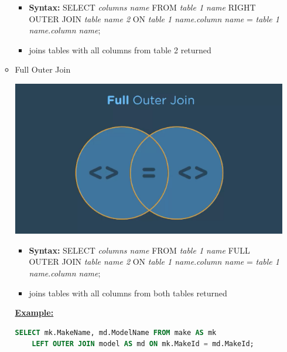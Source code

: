 \documentclass[12pt]{article}
\begin{document}
\begin{itemize}
\begin{itemize}
        \begin{itemize}
            \item \textbf{Syntax:} SELECT \textit{columns name} FROM \textit{table 1 name}
            RIGHT OUTER JOIN \textit{table name 2} ON \textit{table 1 name}.\textit{column name} = \textit{table 1 name}.\textit{column name};
            \item joins tables with all columns from table 2 returned
        \end{itemize}

        \item Full Outer Join
        \begin{center}
        \includegraphics[width=0.6\linewidth]{images/part_4_notes_7.png}
        \end{center}

        \begin{itemize}
            \item \textbf{Syntax:} SELECT \textit{columns name} FROM \textit{table 1 name}
            FULL OUTER JOIN \textit{table name 2} ON \textit{table 1 name}.\textit{column name} = \textit{table 1 name}.\textit{column name};
            \item joins tables with all columns from both tables returned
        \end{itemize}

        \bigskip

        \underline{\textbf{Example:}}

        \bigskip

    \begin{lstlisting}[language=SQL]
    SELECT mk.MakeName, md.ModelName FROM make AS mk
    LEFT OUTER JOIN model AS md ON mk.MakeId = md.MakeId;
    \end{lstlisting}

        \bigskip


\end{itemize}
\end{itemize}
\end{document}
